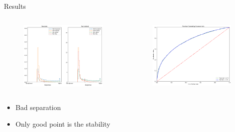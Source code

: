 \begin{frame}{Results}
\begin{columns}
  \begin{column}{0.5\textwidth}
    \begin{figure}
      \includegraphics[width=\textwidth]{Response_Lorentz}
    \end{figure}
  \end{column}
  \begin{column}{0.5\textwidth}
    \begin{figure}
      \includegraphics[width=\textwidth]{ROC_Lorentz}
    \end{figure}
  \end{column}
\end{columns}
%
\begin{itemize}
  \item Bad separation
  \item Only good point is the stability
\end{itemize}
\end{frame}